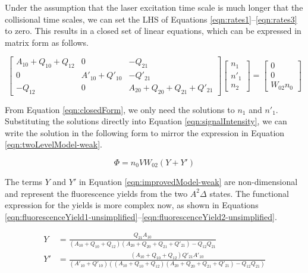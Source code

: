 Under the assumption that the laser excitation time scale is much longer that the collisional time scales, we can set the LHS of Equations \ref{eqn:rates1}--\ref{eqn:rates3} to zero.
This results in a closed set of linear equations, which can be expressed in matrix form as follows.

\begin{equation}
  \left[
    \begin{matrix}
      A_{10} + Q_{10} + Q_{12} & 0 & -Q_{21}\\
      0 & A'_{10} + Q'_{10} & -Q'_{21}\\
      -Q_{12} & 0 & A_{20} + Q_{20} + Q_{21} + Q'_{21}
    \end{matrix}
  \right]\left[
    \begin{matrix}
      n_1\\
      n'_1\\
      n_2
    \end{matrix}
  \right] = \left[
    \begin{matrix}
      0\\
      0\\
      W_{02}n_0
    \end{matrix}
  \right]
  \label{eqn:closedForm}
\end{equation}

From Equation \ref{eqn:closedForm}, we only need the solutions to \(n_1\) and \(n'_1\).
Substituting the solutions directly into Equation \ref{eqn:signalIntensity}, we can write the solution in the following form to mirror the expression in Equation \ref{eqn:twoLevelModel-weak}.

\begin{equation}
  \Phi = n_0VW_{02}(Y + Y')
  \label{eqn:improvedModel-weak}
\end{equation}

The terms \(Y\) and \(Y'\) in Equation \ref{eqn:improvedModel-weak} are non-dimensional and represent the fluorescence yields from the two \(A^2\Delta\) states.
The functional expression for the yields is more complex now, as shown in Equations \ref{eqn:fluorescenceYield1-unsimplified}--\ref{eqn:fluorescenceYield2-unsimplified}.

\begin{align}
  Y &= \frac{ Q_{21} A_{10} }{ ( A_{10} + Q_{10} + Q_{12} )( A_{20} + Q_{20} + Q_{21} + Q'_{21} ) - Q_{12}Q_{21} }
  \label{eqn:fluorescenceYield1-unsimplified}\\
  Y' &= \frac{ ( A_{10} + Q_{10} + Q_{12} )Q'_{21} A'_{10} }{ ( A'_{10} + Q'_{10} ) ( ( A_{10} + Q_{10} + Q_{12} )( A_{20} + Q_{20} + Q_{21} + Q'_{21} ) - Q_{12}Q_{21} ) }
  \label{eqn:fluorescenceYield2-unsimplified}
\end{align}

